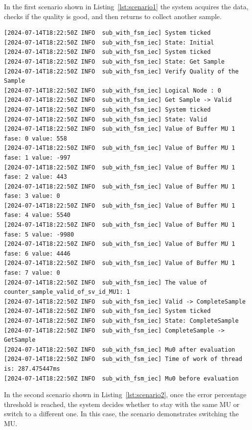 In the first scenario shown in Listing~\ref{lst:scenario1} the system acquires the data, checks if the quality is good, and then returns to collect another sample.

\begin{lstlisting}[caption={First scenario showing the steps through the state machine between the state Get Sample -> Valid, Valid -> Complete Sample -> Get Sample.}, label={lst:scenario1}]
[2024-07-14T18:22:50Z INFO  sub_with_fsm_iec] System ticked
[2024-07-14T18:22:50Z INFO  sub_with_fsm_iec] State: Initial
[2024-07-14T18:22:50Z INFO  sub_with_fsm_iec] System ticked
[2024-07-14T18:22:50Z INFO  sub_with_fsm_iec] State: Get Sample
[2024-07-14T18:22:50Z INFO  sub_with_fsm_iec] Verify Quality of the Sample
[2024-07-14T18:22:50Z INFO  sub_with_fsm_iec] Logical Node : 0
[2024-07-14T18:22:50Z INFO  sub_with_fsm_iec] Get Sample -> Valid
[2024-07-14T18:22:50Z INFO  sub_with_fsm_iec] System ticked
[2024-07-14T18:22:50Z INFO  sub_with_fsm_iec] State: Valid
[2024-07-14T18:22:50Z INFO  sub_with_fsm_iec] Value of Buffer MU 1 fase: 0 value: 558
[2024-07-14T18:22:50Z INFO  sub_with_fsm_iec] Value of Buffer MU 1 fase: 1 value: -997
[2024-07-14T18:22:50Z INFO  sub_with_fsm_iec] Value of Buffer MU 1 fase: 2 value: 443
[2024-07-14T18:22:50Z INFO  sub_with_fsm_iec] Value of Buffer MU 1 fase: 3 value: 0
[2024-07-14T18:22:50Z INFO  sub_with_fsm_iec] Value of Buffer MU 1 fase: 4 value: 5540
[2024-07-14T18:22:50Z INFO  sub_with_fsm_iec] Value of Buffer MU 1 fase: 5 value: -9980
[2024-07-14T18:22:50Z INFO  sub_with_fsm_iec] Value of Buffer MU 1 fase: 6 value: 4446
[2024-07-14T18:22:50Z INFO  sub_with_fsm_iec] Value of Buffer MU 1 fase: 7 value: 0
[2024-07-14T18:22:50Z INFO  sub_with_fsm_iec] The value of counter_sample_valid_of_sv_id_MU1: 1
[2024-07-14T18:22:50Z INFO  sub_with_fsm_iec] Valid -> CompleteSample
[2024-07-14T18:22:50Z INFO  sub_with_fsm_iec] System ticked
[2024-07-14T18:22:50Z INFO  sub_with_fsm_iec] State: CompleteSample
[2024-07-14T18:22:50Z INFO  sub_with_fsm_iec] CompleteSample -> GetSample
[2024-07-14T18:22:50Z INFO  sub_with_fsm_iec] Mu0 after evaluation
[2024-07-14T18:22:50Z INFO  sub_with_fsm_iec] Time of work of thread is: 287.475447ms
[2024-07-14T18:22:50Z INFO  sub_with_fsm_iec] Mu0 before evaluation
\end{lstlisting}

In the second scenario shown in Listing~\ref{lst:scenario2}, once the error percentage threshold is reached, the system decides whether to stay with the same MU or switch to a different one. In this case, the scenario demonstrates switching the MU.

